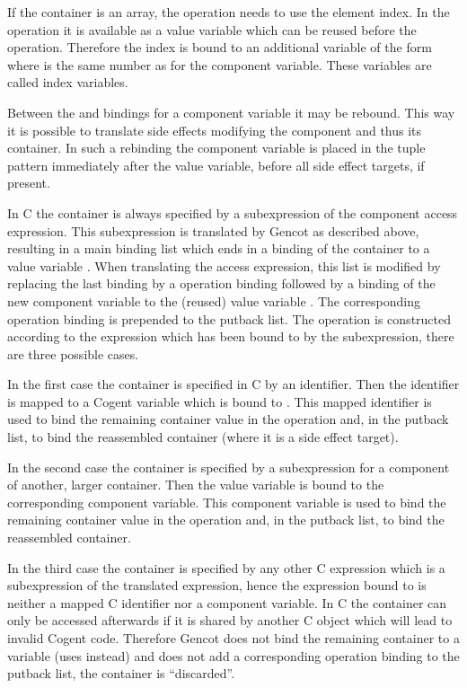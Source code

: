 If the container is an array, the  operation needs to use the element index. In the  operation it is
available as a value variable which can be reused before the  operation. Therefore the index is bound to an 
additional variable of the form  where  is the same number as for the component variable. These
variables are called index variables.

Between the  and  bindings for a component variable it may be rebound. This way it is possible to translate
side effects modifying the component and thus its container. In such a rebinding the component variable is placed in the 
tuple pattern immediately after the value variable, before all side effect targets, if present.

In C the container is always specified by a subexpression of the component access expression. This subexpression is translated 
by Gencot as described above, resulting in a main binding list which ends in a binding of the container to a value
variable . When translating the access expression, this list is modified by replacing the last binding by 
a  operation binding followed by a binding of the new component variable
to the (reused) value variable . The corresponding  operation binding is prepended to the putback list. The 
 operation is constructed according to the expression which has been bound to  by the subexpression, 
there are three possible cases.

In the first case the container is specified in C by an identifier. Then the identifier is mapped to a Cogent variable 
which is bound to . This mapped identifier is used to bind the remaining container value in the  operation and, in 
the putback list, to bind the reassembled container (where it is a side effect target). 

In the second case the container is specified by a subexpression for a component of another, larger container. Then
the value variable  is bound to the corresponding component variable. This component variable is used to bind the remaining 
container value in the  operation and, in the putback list, to bind the reassembled container.

In the third case the container is specified by any other C expression which is a subexpression of the translated expression, 
hence the expression bound to  is neither a mapped C identifier nor a component variable. In C the container can 
only be accessed afterwards if it is shared by another C object which will lead to invalid Cogent code. Therefore Gencot does
not bind the remaining container to a variable (uses \code{\_} instead) and does not add a corresponding  operation
binding to the putback list, the container is ``discarded''.

